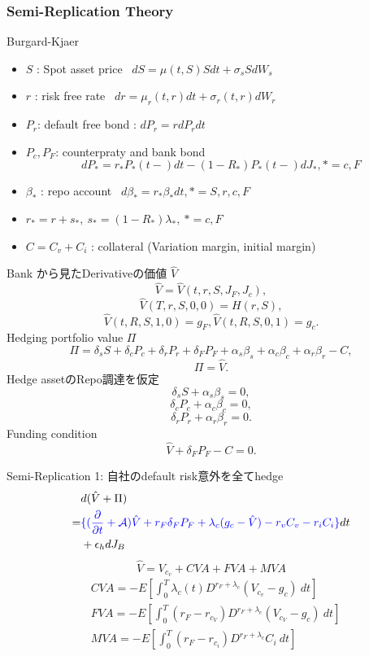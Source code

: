 \documentclass[driverfallback=dvipdfmx,cjk]{beamer}
\begin{document}
\begin{frame} \frametitle{Semi-Replication Theory }
    Burgard-Kjaer
    \begin{itemize}
        \item $S$ : Spot asset price \ 
        $ dS = \mu(t, S)Sdt + \sigma_s S dW_s $
        \item $r$ : risk free rate \ 
        $dr = \mu_r(t, r)dt + \sigma_r(t, r) dW_r$
        \item $P_r$: default free bond : $dP_r = rdP_r dt$
        \item $P_c, P_F$: counterpraty and bank bond 
        $$dP_* = r_* P_*(t-) dt - (1-R_*) P_*(t-) dJ_*, *=c,F$$
        \item $\beta_{*}$ : repo account \  $d\beta_{*} = r_* \beta_* dt, * = S, r, c, F$
        \item $r_* = r + s_*, \ s_* = (1-R_*)\lambda_*, \ *= c, F$
        \item $C = C_v + C_i$ : collateral (Variation margin, initial margin)
    \end{itemize}


\end{frame}

\begin{frame}
Bank から見たDerivativeの価値 $\hat{V}$
   $$\hat{V} = \hat{V}(t, r, S, J_F, J_c), $$
   $$ \hat{V}(T, r, S, 0, 0) = H(r, S),$$
   $$\hat{V}(t, R, S, 1, 0) = g_F, \hat{V}(t, R, S, 0, 1) = g_c.$$
 Hedging portfolio value $\Pi$
$$\Pi = \delta_s S + \delta_c P_c + \delta_r P_r + \delta_F P_F + \alpha_s\beta_s + \alpha_c \beta_c + \alpha_r \beta_r - C,$$
   $$ \Pi = \hat{V}.$$
   Hedge assetのRepo調達を仮定 
   $$\delta_s S + \alpha_s \beta_s = 0, $$
   $$\delta_c P_c + \alpha_c \beta_c = 0, $$
   $$\delta_r P_r + \alpha_r \beta_r = 0. $$
   Funding condition
   $$\hat{V} + \delta_F P_F - C = 0.$$

\end{frame}

\begin{frame}
    Semi-Replication 1: 自社のdefault risk意外を全てhedge
   \begin{align*}
    &d(\hat{V} + \Pi)\\
    = &\textcolor{blue}{\{ (\frac{\partial }{ \partial t} + \mathcal{A}) \hat{V} + r_F\delta_FP_F + \lambda_c(g_c - \hat{V}) -r_vC_v - r_iC_i \}}dt\\
    &  + \epsilon_h d J_B  
   \end{align*}
   $$ \hat{V}= V_{c_v} + CVA + FVA + MVA $$
   \begin{align*}
    &CVA = -E[\int_0^T \lambda_c(t) D^{r_F + \lambda_c}(V_{c_v}-g_c) \ dt]\\
    &FVA = -E[\int_0^T (r_F - r_{c_V}) D^{r_F + \lambda_c}(V_{c_V}-g_c) \ dt]\\
    &MVA = -E[\int_0^T (r_F - r_{c_i}) D^{r_F + \lambda_c}C_i \  dt]
   \end{align*}
\end{frame}
\end{document}
